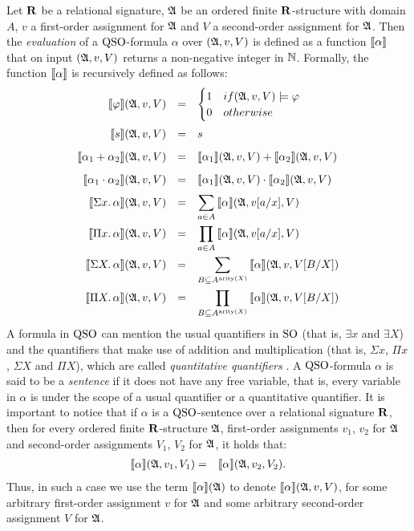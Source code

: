 Let $\mathbf{R}$ be a relational signature, $\mathfrak{A}$ be an ordered finite $\mathbf{R}$-structure with domain $A$, $v$ a first-order assignment for $\mathfrak{A}$ and $V$ a second-order assignment for $\mathfrak{A}$. Then the \emph{evaluation} of a ${\rm QSO}$-formula $\alpha$ over $(\mathfrak{A}, v, V)$ is defined as a function ${\llbracket{}{\alpha}\rrbracket}$ that on input $(\mathfrak{A}, v, V)$ returns a non-negative integer in $\mathbb{N}$. Formally, the function ${\llbracket{}{\alpha}\rrbracket}$ is recursively defined as follows:
$$
\renewcommand{\arraystretch}{1.7}
\begin{array}{rcl} 
\sem{\varphi}(\A, v, V) & = & 
\begin{cases}
1 & \mbox{if } (\A, v, V) \models \varphi \\
0 & \mbox{otherwise}
\end{cases}\\
\sem{s}(\A, v, V) & = & s \\
\sem{\alpha_1 \add \alpha_2}(\A, v, V) & = & \sem{\alpha_1}(\A, v, V) + \sem{\alpha_2}(\A, v, V)\\
\sem{\alpha_1 \mult \alpha_2}(\A, v, V) & = & \sem{\alpha_1}(\A, v, V) \cdot \sem{\alpha_2}(\A, v, V)\\ 
\sem{\sa{x} \alpha}(\A, v, V) & = & \displaystyle \sum_{a \in A} \sem{\alpha}(\A,v[a/x],V)\\
\sem{\pa{x} \alpha}(\A, v, V) & = & \displaystyle \prod_{a \in A} \sem{\alpha}(\A,v[a/x],V)\\
\sem{\sa{X} \alpha}(\A, v, V) & = & \displaystyle \sum_{B \subseteq A^{\arity(X)}} \sem{\alpha}(\A, v, V[B/X])\\
\sem{\pa{X} \alpha}(\A, v, V) & = & \displaystyle \prod_{B \subseteq A^{\arity(X)}} \sem{\alpha}(\A, v, V[B/X])
\end{array}
$$
A formula in ${\rm QSO}$ can mention the usual quantifiers in ${\rm SO}$ (that is, $\exists x$ and $\exists X$) and the quantifiers that make use of addition and multiplication (that is, $\Sigma x$, $\Pi x$, $\Sigma X$ and $\Pi X$), which are called {\em quantitative quantifiers} . A ${\rm QSO}$-formula $\alpha$ is said to be a \emph{sentence} if it does not have any free variable, that is, every variable in $\alpha$ is under the scope of a usual quantifier or a quantitative quantifier. It is important to notice that if $\alpha$ is a ${\rm QSO}$-sentence over a relational signature $\mathbf{R}$, then for every ordered finite $\mathbf{R}$-structure $\mathfrak{A}$, first-order assignments $v_1$, $v_2$ for $\mathfrak{A}$ and second-order assignments $V_1$, $V_2$ for $\mathfrak{A}$, it holds that:
\begin{eqnarray*}
	{\llbracket{}{\alpha}\rrbracket}(\mathfrak{A}, v_1, V_1) & = & {\llbracket{}{\alpha}\rrbracket}(\mathfrak{A}, v_2, V_2).
\end{eqnarray*}
Thus, in such a case we use the term ${\llbracket{}{\alpha}\rrbracket}(\mathfrak{A})$ to denote ${\llbracket{}{\alpha}\rrbracket}(\mathfrak{A}, v, V)$, for some arbitrary first-order assignment $v$ for $\mathfrak{A}$ and some arbitrary second-order assignment $V$ for $\mathfrak{A}$. 

